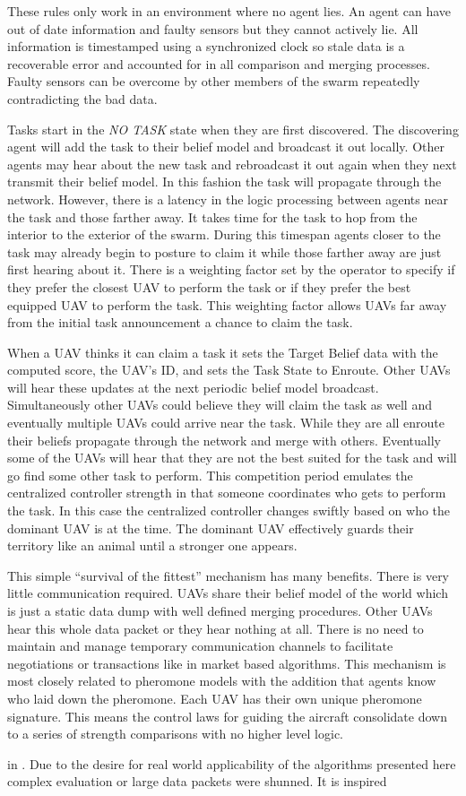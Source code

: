 These rules only work in an environment where no agent lies.  An agent can have out of date information and faulty sensors but they cannot actively lie.  All information is timestamped using a synchronized clock so stale data is a recoverable error and accounted for in all comparison and merging processes.  Faulty sensors can be overcome by other members of the swarm repeatedly contradicting the bad data.

Tasks start in the \textit{NO TASK} state when they are first discovered.  The discovering agent will add the task to their belief model and broadcast it out locally.  Other agents may hear about the new task and rebroadcast it out again when they next transmit their belief model.  In this fashion the task will propagate through the network.  However, there is a latency in the logic processing between agents near the task and those farther away.  It takes time for the task to hop from the interior to the exterior of the swarm.  During this timespan agents closer to the task may already begin to posture to claim it while those farther away are just first hearing about it.  There is a weighting factor set by the operator to specify if they prefer the closest UAV to perform the task or if they prefer the best equipped UAV to perform the task.  This weighting factor allows UAVs far away from the initial task announcement a chance to claim the task.

When a UAV thinks it can claim a task it sets the Target Belief data with the computed score, the UAV's ID, and sets the Task State to Enroute.  Other UAVs will hear these updates at the next periodic belief model broadcast.  Simultaneously other UAVs could believe they will claim the task as well and eventually multiple UAVs could arrive near the task.  While they are all enroute their beliefs propagate through the network and merge with others.  Eventually some of the UAVs will hear that they are not the best suited for the task and will go find some other task to perform.  This competition period emulates the centralized controller strength in that someone coordinates who gets to perform the task.  In this case the centralized controller changes swiftly based on who the dominant UAV is at the time.  The dominant UAV effectively guards their territory like an animal until a stronger one appears.

This simple ``survival of the fittest'' mechanism has many benefits.  There is very little communication required.  UAVs share their belief model of the world which is just a static data dump with well defined merging procedures.  Other UAVs hear this whole data packet or they hear nothing at all.  There is no need to maintain and manage temporary communication channels to facilitate negotiations or transactions like in market based algorithms.  This mechanism is most closely related to pheromone models with the addition that agents know who laid down the pheromone.  Each UAV has their own unique pheromone signature.  This means the control laws for guiding the aircraft consolidate down to a series of strength comparisons with no higher level logic.


 in . Due to the desire for real world applicability of the algorithms presented here complex evaluation or large data packets were shunned. It is inspired